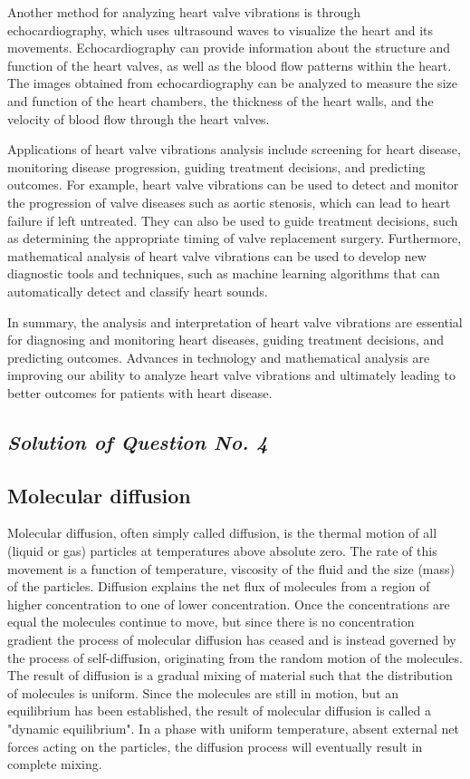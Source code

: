 \documentclass[12pt, a4paper]{article} %
\begin{document}
Another method for analyzing heart valve vibrations is through echocardiography, which uses ultrasound waves to visualize the heart and its movements. Echocardiography can provide information about the structure and function of the heart valves, as well as the blood flow patterns within the heart. The images obtained from echocardiography can be analyzed to measure the size and function of the heart chambers, the thickness of the heart walls, and the velocity of blood flow through the heart valves.

Applications of heart valve vibrations analysis include screening for heart disease, monitoring disease progression, guiding treatment decisions, and predicting outcomes. For example, heart valve vibrations can be used to detect and monitor the progression of valve diseases such as aortic stenosis, which can lead to heart failure if left untreated. They can also be used to guide treatment decisions, such as determining the appropriate timing of valve replacement surgery. Furthermore, mathematical analysis of heart valve vibrations can be used to develop new diagnostic tools and techniques, such as machine learning algorithms that can automatically detect and classify heart sounds.

In summary, the analysis and interpretation of heart valve vibrations are essential for diagnosing and monitoring heart diseases, guiding treatment decisions, and predicting outcomes. Advances in technology and mathematical analysis are improving our ability to analyze heart valve vibrations and ultimately leading to better outcomes for patients with heart disease.


\pagebreak

\subsection{\slshape Solution of Question No. 4}


\subsection*{Molecular diffusion}
Molecular diffusion, often simply called diffusion, is the thermal motion of all (liquid or gas) particles at temperatures above absolute zero. The rate of this movement is a function of temperature, viscosity of the fluid and the size (mass) of the particles. Diffusion explains the net flux of molecules from a region of higher concentration to one of lower concentration. Once the concentrations are equal the molecules continue to move, but since there is no concentration gradient the process of molecular diffusion has ceased and is instead governed by the process of self-diffusion, originating from the random motion of the molecules. The result of diffusion is a gradual mixing of material such that the distribution of molecules is uniform. Since the molecules are still in motion, but an equilibrium has been established, the result of molecular diffusion is called a "dynamic equilibrium". In a phase with uniform temperature, absent external net forces acting on the particles, the diffusion process will eventually result in complete mixing.
\end{document}
